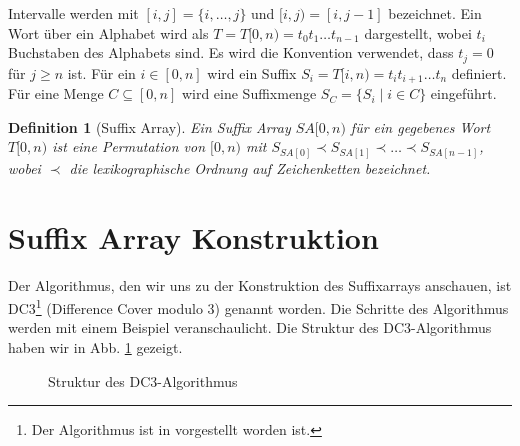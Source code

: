 \documentclass[12pt]{report}
\newtheorem{definition}{Definition}
\begin{document}
Intervalle werden mit $[i,j] = \{ i, \dots, j\}$ und $[i,j) = [i,j-1]$ bezeichnet. Ein Wort über ein Alphabet wird als $T = T[0,n) = t_0 t_1 \dots t_{n-1}$ dargestellt, wobei $t_i$ Buchstaben des Alphabets sind. Es wird die Konvention verwendet, dass $t_j = 0$ für $j \ge n$ ist. Für ein $i \in [0,n]$ wird ein Suffix $S_i = T[i,n) = t_i t_{i+1} \dots t_n$ definiert. Für eine Menge $C \subseteq [0,n]$ wird eine Suffixmenge $S_C = \{ S_i \mid i \in C\}$ eingeführt.

\begin{definition}[Suffix Array]
Ein Suffix Array $SA[0,n)$ für ein gegebenes Wort $T[0,n)$ ist eine Permutation von $[0,n)$ mit $S_{SA[0]} \prec S_{SA[1]} \prec \dots \prec S_{SA[n-1]}$, wobei $\prec$ die lexikographische Ordnung auf Zeichenketten bezeichnet.
\end{definition}

\section{Suffix Array Konstruktion}
\label{sec:SuffixArrayKonstruktion}

Der Algorithmus, den wir uns zu der Konstruktion des Suffixarrays anschauen, ist DC3\footnote{Der Algorithmus ist in \cite{Karkkainen2006} vorgestellt worden ist.} (Difference Cover modulo 3) genannt worden. Die Schritte des Algorithmus werden mit einem Beispiel veranschaulicht. Die Struktur des DC3-Algorithmus haben wir in Abb. \ref{fig:strukturDC3} gezeigt.

\begin{figure}[htb]
\centering
{}
\caption{Struktur des DC3-Algorithmus}
\label{fig:strukturDC3}
\end{figure}
\end{document}
